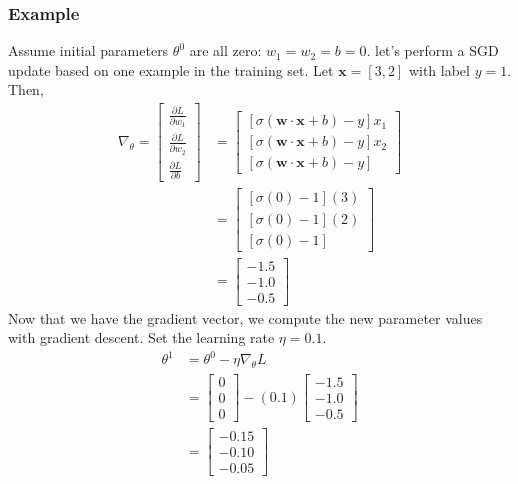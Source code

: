 \documentclass[11pt]{article}
\begin{document}
\subsubsection{Example}
Assume initial parameters $\theta^0$ are all zero: $w_1=w_2=b=0$. let's perform a SGD update based on one example in the training set. Let $\mathbf{x}=[3,2]$ with label $y=1$. Then,
\begin{align*}
    \nabla_{\theta}=\begin{bmatrix}
        \frac{\partial L}{\partial w_1} \\
        \frac{\partial L}{\partial w_2} \\
        \frac{\partial L}{\partial b}
    \end{bmatrix}
    &=\begin{bmatrix}
        [\sigma(\mathbf{w}\cdot\mathbf{x}+b)-y]x_1 \\
        [\sigma(\mathbf{w}\cdot\mathbf{x}+b)-y]x_2 \\
        [\sigma(\mathbf{w}\cdot\mathbf{x}+b)-y]
    \end{bmatrix} \\
    &=\begin{bmatrix}
        [\sigma(0)-1](3) \\
        [\sigma(0)-1](2) \\
        [\sigma(0)-1]
    \end{bmatrix} \\
    &=\begin{bmatrix}
        -1.5 \\
        -1.0 \\
        -0.5
    \end{bmatrix}
\end{align*}
Now that we have the gradient vector, we compute the new parameter values with gradient descent. Set the learning rate $\eta=0.1$.
\begin{align*}
    \theta^1&=\theta^0-\eta\nabla_\theta L \\
    &=\begin{bmatrix}
        0 \\
        0 \\
        0
    \end{bmatrix}
    -(0.1)\begin{bmatrix}
        -1.5 \\
        -1.0 \\
        -0.5
    \end{bmatrix} \\
    &=\begin{bmatrix}
        -0.15 \\
        -0.10 \\
        -0.05
    \end{bmatrix}
\end{align*}
\end{document}
